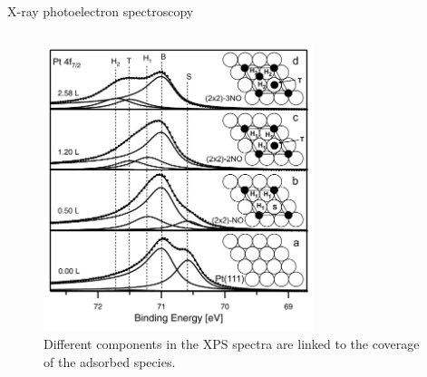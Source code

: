 \begin{frame}{X-ray photoelectron spectroscopy}
\begin{columns}

    \begin{figure}
        \centering
        \includegraphics[width=0.7\textwidth]{Figures/xps_data/xps_multiple_peaks.png}
        \caption{Different components in the XPS spectra are linked to the coverage of the adsorbed species\footnotemark{}.}
        \label{fig:xps_multiple_peaks}
    \end{figure}

    \vspace{-0.3cm}

    \end{columns}
    

\end{frame}